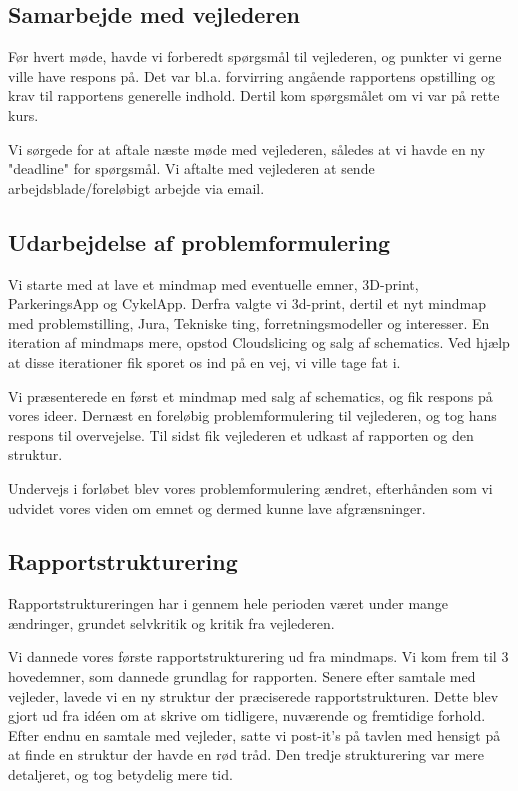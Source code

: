 \subsection{Samarbejde med vejlederen}

Før hvert møde, havde vi forberedt spørgsmål til vejlederen, og punkter vi gerne ville have respons på. Det var bl.a. forvirring angående rapportens opstilling og krav til rapportens generelle indhold. Dertil kom spørgsmålet om vi var på rette kurs.

Vi sørgede for at aftale næste møde med vejlederen, således at vi havde en ny "deadline" for spørgsmål. Vi aftalte med vejlederen at sende arbejdsblade/foreløbigt arbejde via email.

\subsection{Udarbejdelse af problemformulering}

Vi starte med at lave et mindmap med eventuelle emner, 3D-print, ParkeringsApp og CykelApp. Derfra valgte vi 3d-print, dertil et nyt mindmap med problemstilling, Jura, Tekniske ting, forretningsmodeller og interesser. En iteration af mindmaps mere, opstod Cloudslicing og salg af schematics. Ved hjælp at disse iterationer fik sporet os ind på en vej, vi ville tage fat i.

Vi præsenterede en først et mindmap med salg af schematics, og fik respons på vores ideer. Dernæst en foreløbig problemformulering til vejlederen, og tog hans respons til overvejelse. Til sidst fik vejlederen et udkast af rapporten og den struktur.

Undervejs i forløbet blev vores problemformulering ændret, efterhånden som vi udvidet vores viden om emnet og dermed kunne lave afgrænsninger.

\subsection{Rapportstrukturering}

Rapportstruktureringen har i gennem hele perioden været under mange ændringer, grundet selvkritik og kritik fra vejlederen.

Vi dannede vores første rapportstrukturering ud fra mindmaps. Vi kom frem til 3 hovedemner, som dannede grundlag for rapporten. Senere efter samtale med vejleder, lavede vi en ny struktur der præciserede rapportstrukturen. Dette blev gjort ud fra idéen om at skrive om tidligere, nuværende og fremtidige forhold. Efter endnu en samtale med vejleder, satte vi post-it's på tavlen med hensigt på at finde en struktur der havde en rød tråd. Den tredje strukturering var mere detaljeret, og tog betydelig mere tid.

